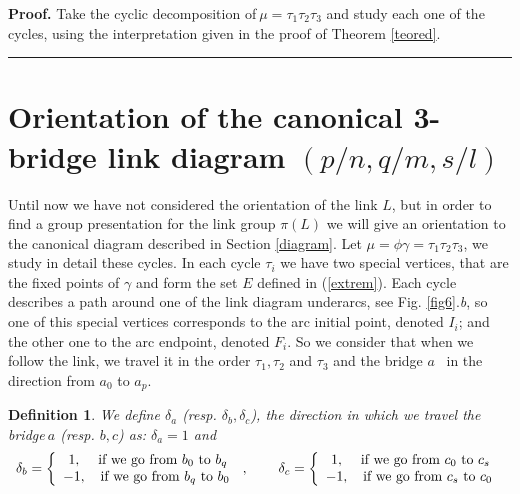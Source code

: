 \documentclass[12pt]{article}%
\newtheorem{definition}[theorem]{Definition}
\newenvironment{proof}[1][Proof]{\noindent\textbf{#1.} }{\ \rule{0.5em}{0.5em}}
\begin{document}
\begin{proof}
Take the cyclic decomposition of$\ \mu=\tau_{1}\tau_{2}\tau_{3}$ and study
each one of the cycles, using the interpretation given in the proof of Theorem
\ref{teored}.
\end{proof}

\section{Orientation of the canonical 3-bridge link diagram $\left(
p/n,q/m,s/l\right)  $\label{secorien}}

Until now we have not considered the orientation of the link $L$, but in order
to find a group presentation for the link group $\pi\left(  L\right)  $ we
will give an orientation to the canonical diagram described in Section
\ref{diagram}. Let $\mu=\phi\gamma=\tau_{1}\tau_{2}\tau_{3}$, we study in
detail these cycles. In each cycle $\tau_{i}$ we have two special vertices,
that are the fixed points of $\gamma$ and form the set $E$ defined in
(\ref{extrem}). Each cycle describes a path around one of the link diagram
underarcs, see Fig. \ref{fig6}.\textit{b}, so one of this special vertices
corresponds to the arc initial point, denoted $I_{i}$; and the other one to
the arc endpoint, denoted $F_{i}$. So we consider that when we follow the
link, we travel it in the order $\tau_{1},\tau_{2}$ and $\tau_{3}$ and the
bridge $a$ \ in the direction from $a_{0}$ to $a_{p}$.

\begin{definition}
We define $\delta_{a}$ (resp. $\delta_{b},\delta_{c}$), the direction in which
we travel the bridge$\ a$ (resp. $b,c$) as: $\delta_{a}=1$ and
\[%
\begin{array}
[c]{ccc}%
\delta_{b}=\left\{
\begin{array}
[c]{cc}%
1, & \text{if we go from }b_{0}\ \text{to }b_{q}\text{\ }\\
-1, & \text{if we go from }b_{q}\ \text{to }b_{0}%
\end{array}
\right.  , & \  & \delta_{c}=\left\{
\begin{array}
[c]{cc}%
1, & \text{if we go from }c_{0}\ \text{to }c_{s}\text{\ }\\
-1, & \text{if we go from }c_{s}\ \text{to }c_{0}%
\end{array}
\right.
\end{array}
\]

\end{definition}
\end{document}
